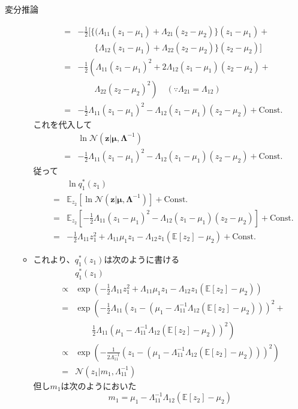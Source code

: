 \documentclass[dvipdfmx,notheorems,t]{beamer}
\begin{document}
\begin{frame}{変分推論}
\begin{itemize}
\begin{itemize}
\begin{eqnarray}
			&=& -\frac{1}{2} \bigg[ \Big\{ (\Lambda_{11} (z_1 - \mu_1) + \Lambda_{21} (z_2 - \mu_2) \Big\} (z_1 - \mu_1) + \nonumber \\
			&& \qquad \Big\{ \Lambda_{12} (z_1 - \mu_1) + \Lambda_{22} (z_2 - \mu_2) \Big\} (z_2 - \mu_2) \bigg] \nonumber \\
			&=& -\frac{1}{2} \left( \Lambda_{11} (z_1 - \mu_1)^2 + 2 \Lambda_{12} (z_1 - \mu_1)(z_2 - \mu_2) + \right. \nonumber \\
			&& \qquad \left. \Lambda_{22} (z_2 - \mu_2)^2 \right) \quad (\because \Lambda_{21} = \Lambda_{12}) \nonumber \\
			&=& -\frac{1}{2} \Lambda_{11} (z_1 - \mu_1)^2 - \Lambda_{12} (z_1 - \mu_1)(z_2 - \mu_2) + \mathrm{Const.}
		\end{eqnarray}
		これを代入して
		\begin{eqnarray}
			&& \ln \mathcal{N}(\bm{z} | \bm{\mu}, \bm{\Lambda}^{-1}) \nonumber \\
			&=& -\frac{1}{2} \Lambda_{11} (z_1 - \mu_1)^2 - \Lambda_{12} (z_1 - \mu_1)(z_2 - \mu_2) + \mathrm{Const.}
		\end{eqnarray}
		従って
		\begin{eqnarray}
			&& \ln q_1^*(z_1) \nonumber \\
			&=& \mathbb{E}_{z_2} \left[ \ln \mathcal{N}(\bm{z} | \bm{\mu}, \bm{\Lambda}^{-1}) \right] + \mathrm{Const.} \nonumber \\
			&=& \mathbb{E}_{z_2} \left[ -\frac{1}{2} \Lambda_{11} (z_1 - \mu_1)^2 - \Lambda_{12} (z_1 - \mu_1)(z_2 - \mu_2) \right] + \mathrm{Const.} \nonumber \\
			&=& -\frac{1}{2} \Lambda_{11} z_1^2 + \Lambda_{11} \mu_1 z_1 - \Lambda_{12} z_1 \left( \mathbb{E}[z_2] - \mu_2 \right) + \mathrm{Const.}
		\end{eqnarray}
		
		\item これより、$q_1^*(z_1)$は次のように書ける
		\begin{eqnarray}
			&& q_1^*(z_1) \nonumber \\
			&\propto& \exp \left( -\frac{1}{2} \Lambda_{11} z_1^2 + \Lambda_{11} \mu_1 z_1 - \Lambda_{12} z_1 \left( \mathbb{E}[z_2] - \mu_2 \right) \right) \nonumber \\
			&=& \exp \left( -\frac{1}{2} \Lambda_{11} \left( z_1 - (\mu_1 - \Lambda_{11}^{-1} \Lambda_{12} (\mathbb{E}[z_2] - \mu_2)) \right)^2 + \right. \nonumber \\
			&& \qquad \left. \frac{1}{2} \Lambda_{11} \left( \mu_1 - \Lambda_{11}^{-1} \Lambda_{12} (\mathbb{E}[z_2] - \mu_2) \right)^2 \right) \nonumber \\
			&\propto& \exp \left( -\frac{1}{2 \Lambda_{11}^{-1}} \left( z_1 - (\mu_1 - \Lambda_{11}^{-1} \Lambda_{12} (\mathbb{E}[z_2] - \mu_2)) \right)^2 \right) \nonumber \\
			&=& \mathcal{N}(z_1 | m_1, \Lambda_{11}^{-1})
		\end{eqnarray}
		但し$m_1$は次のようにおいた
		\begin{equation}
			m_1 = \mu_1 - \Lambda_{11}^{-1} \Lambda_{12} (\mathbb{E}[z_2] - \mu_2)
		\end{equation}
		

\end{itemize}
\end{itemize}
\end{frame}
\end{document}
